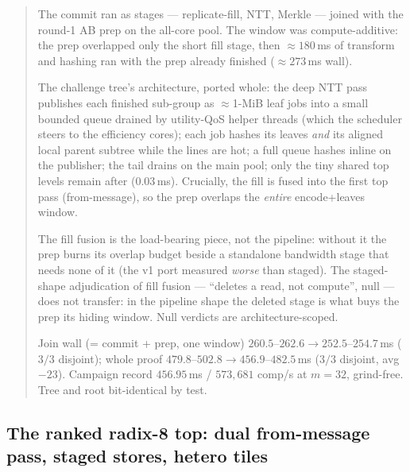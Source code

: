 \documentclass[11pt]{article}
\newenvironment{optsummary}{%
  \begin{quote}\small
  \begin{description}
  \setlength{\itemsep}{1pt}\setlength{\parsep}{0pt}\setlength{\topsep}{2pt}
}{%
  \end{description}
  \end{quote}
}
\begin{document}
\begin{optsummary}
\item[Baseline:] The commit ran as stages --- replicate-fill, NTT, Merkle --- joined with the round-1 AB prep on the all-core pool. The window was compute-additive: the prep overlapped only the short fill stage, then $\approx180\,$ms of transform and hashing ran with the prep already finished ($\approx273\,$ms wall).
\item[Improvement:] The challenge tree's architecture, ported whole: the deep NTT pass publishes each finished sub-group as $\approx$1-MiB leaf jobs into a small bounded queue drained by utility-QoS helper threads (which the scheduler steers to the efficiency cores); each job hashes its leaves \emph{and} its aligned local parent subtree while the lines are hot; a full queue hashes inline on the publisher; the tail drains on the main pool; only the tiny shared top levels remain after ($0.03\,$ms). Crucially, the fill is fused into the first top pass (from-message), so the prep overlaps the \emph{entire} encode+leaves window.
\item[Mechanism:] The fill fusion is the load-bearing piece, not the pipeline: without it the prep burns its overlap budget beside a standalone bandwidth stage that needs none of it (the v1 port measured \emph{worse} than staged). The staged-shape adjudication of fill fusion --- ``deletes a read, not compute'', null --- does not transfer: in the pipeline shape the deleted stage is what buys the prep its hiding window. Null verdicts are architecture-scoped.
\item[Result:] Join wall (= commit + prep, one window) $260.5$--$262.6\to252.5$--$254.7\,$ms ($3/3$ disjoint); whole proof $479.8$--$502.8\to456.9$--$482.5\,$ms ($3/3$ disjoint, avg $-23$). Campaign record $456.95\,$ms / $573{,}681$ comp/s at $m{=}32$, grind-free. Tree and root bit-identical by test.
\end{optsummary}

\subsection{The ranked radix-8 top: dual from-message pass, staged stores, hetero tiles}
\label{sec:rankedtop}
\end{document}
